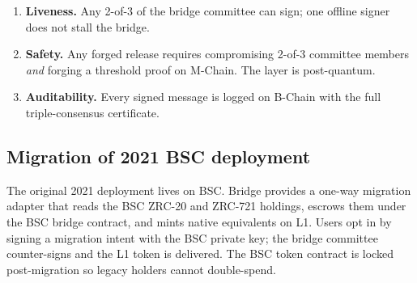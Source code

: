 \begin{enumerate}[leftmargin=1.4em]
  \item \textbf{Liveness.} Any 2-of-3 of the bridge committee can
        sign; one offline signer does not stall the bridge.
  \item \textbf{Safety.} Any forged release requires compromising 2-of-3
        committee members \emph{and} forging a \Ringtail{} threshold
        proof on M-Chain. The \Ringtail{} layer is post-quantum.
  \item \textbf{Auditability.} Every signed message is logged on
        B-Chain with the full triple-consensus certificate.
\end{enumerate}

\subsection{Migration of 2021 \Zoo{} BSC deployment}

The original 2021 \Zoo{} deployment lives on BSC. \Zoo{} Bridge
provides a one-way migration adapter that reads the BSC ZRC-20 and
ZRC-721 holdings, escrows them under the BSC bridge contract, and
mints native equivalents on \Zoo{} L1. Users opt in by signing a
migration intent with the BSC private key; the bridge committee
counter-signs and the L1 token is delivered. The BSC token contract
is locked post-migration so legacy holders cannot double-spend.
